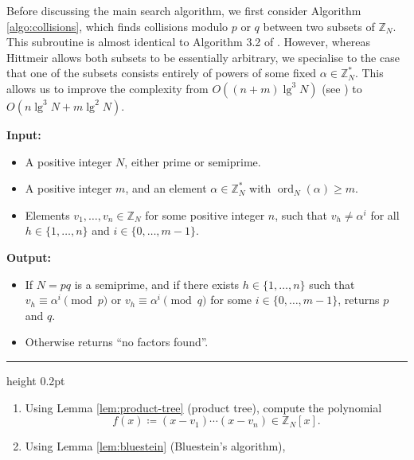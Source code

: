 \documentclass[reqno]{amsart}
\theoremstyle{remark}
\numberwithin{equation}{section}
\numberwithin{thm}{section}
\newcommand{\ZZ}{\mathbb{Z}}
\renewcommand{\geq}{\geqslant}
\newcommand{\defeq}{\coloneqq}
\DeclareMathOperator{\ord}{ord}
\begin{document}
Before discussing the main search algorithm,
we first consider Algorithm \ref{algo:collisions},
which finds collisions modulo $p$ or $q$ between two subsets of $\ZZ_N$.
This subroutine is almost identical to
Algorithm 3.2 of \cite{Hit-timespace}.
However, whereas Hittmeir allows both subsets to be essentially arbitrary,
we specialise to the case that one of the subsets consists entirely
of powers of some fixed $\alpha \in \ZZ^*_N$.
This allows us to improve the complexity from $O((n + m) \lg^3 N)$
(see \cite[Lem.~3.3]{Hit-timespace}) to $O(n \lg^3 N + m \lg^2 N)$.
\begin{myalgorithm}[ht]
\caption{-- finding collisions modulo $p$ or $q$}
\label{algo:collisions}
  \begin{flushleft}
  \textbf{Input:}
  \begin{itemize}[label=--,labelwidth=0.7cm,leftmargin=]
    \item A positive integer $N$, either prime or semiprime.
    \item A positive integer $m$,
      and an element $\alpha \in \ZZ_N^*$ with $\ord_N(\alpha) \geq m$.
    \item Elements $v_1, \ldots, v_n \in \ZZ_N$
      for some positive integer $n$,
      such that $v_h \neq \alpha^i$
      for all $h \in \{1, \ldots, n\}$ and $i \in \{0, \ldots, m-1\}$.
  \end{itemize}
  \textbf{Output:}
  \begin{itemize}[label=--,labelwidth=0.7cm,leftmargin=]
    \item If $N = pq$ is a semiprime,
    and if there exists $h \in \{1, \ldots, n\}$ such that
    $v_h \equiv \alpha^i \pmod p$ or $v_h \equiv \alpha^i \pmod q$
    for some $i \in \{0, \ldots, m-1\}$, returns $p$ and $q$.
    \item Otherwise returns ``no factors found''.
  \end{itemize}
  \end{flushleft}
  \vspace{2pt} \hrule height 0.2pt \vspace{1pt}
  \begin{enumerate}[label=\arabic*),labelwidth=0.7cm,leftmargin=\labelwidth,itemsep=0.2em,topsep=\itemsep]
    \item Using Lemma \ref{lem:product-tree} (product tree),
      compute the polynomial
      \[ f(x) \defeq (x - v_1) \cdots (x - v_n) \in \ZZ_N[x]. \]
    \item Using Lemma \ref{lem:bluestein} (Bluestein's algorithm),

\end{enumerate}
\end{myalgorithm}
\end{document}

